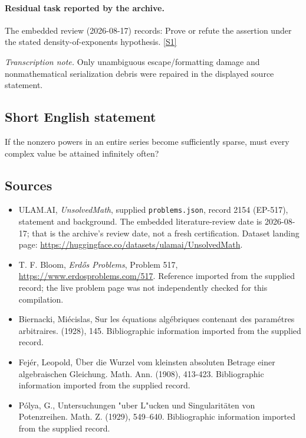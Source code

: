 \documentclass[11pt,a4paper]{article}
\newcommand{\sref}[2]{\hyperlink{source:#1:#2}{[S#2]}}
\begin{document}
\paragraph{Residual task reported by the archive.}

The embedded review (2026-08-17) records: Prove or refute the assertion under the stated density-of-exponents hypothesis. \sref{2154}{1}

{\small\emph{Transcription note.} Only unambiguous escape/formatting damage and nonmathematical serialization debris were repaired in the displayed source statement.}

\subsection{Short English statement}

If the nonzero powers in an entire series become sufficiently sparse, must every complex value be attained infinitely often?

\subsection{Sources}

{\small

\begin{itemize}

\item[\hypertarget{source:2154:1}{S1}] ULAM.AI, \emph{UnsolvedMath}, supplied \texttt{problems.json}, record 2154 (EP-517), statement and background. The embedded literature-review date is 2026-08-17; that is the archive’s review date, not a fresh certification. Dataset landing page: \url{https://huggingface.co/datasets/ulamai/UnsolvedMath}.

\item[\hypertarget{source:2154:2}{S2}] T. F. Bloom, \emph{Erdős Problems}, Problem 517, \url{https://www.erdosproblems.com/517}. Reference imported from the supplied record; the live problem page was not independently checked for this compilation.

\item[\hypertarget{source:2154:3}{S3}] Biernacki, Mi\'{e}cislas, Sur les \'{e}quations alg\'{e}briques contenant des param\'{e}tres arbitraires. (1928), 145. Bibliographic information imported from the supplied record.

\item[\hypertarget{source:2154:4}{S4}] Fej\'{e}r, Leopold, \"{U}ber die Wurzel vom kleinsten absoluten Betrage einer algebraischen Gleichung. Math. Ann. (1908), 413-423. Bibliographic information imported from the supplied record.

\item[\hypertarget{source:2154:5}{S5}] P\'olya, G., Untersuchungen "uber {L}"ucken und {S}ingularit\"{a}ten von {P}otenzreihen. Math. Z. (1929), 549--640. Bibliographic information imported from the supplied record.

\end{itemize}

}

\label{end:2154}
\end{document}
